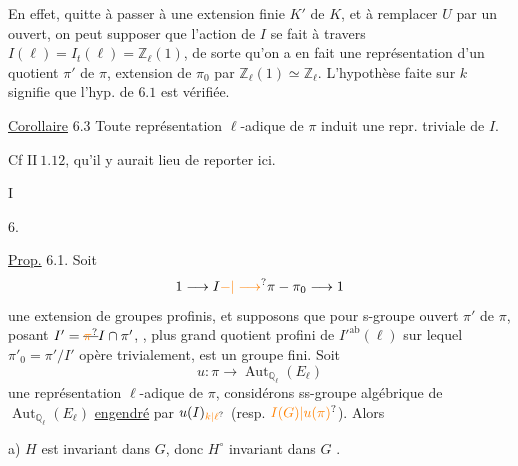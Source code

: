 En effet, quitte à passer à une extension finie $K'$ de $K$, et à remplacer $U$ par un ouvert, on peut supposer que l'action de $I$ se fait à travers $I(\ell)=I_t(\ell)=\mathbb Z_\ell(1)$,  de sorte qu'on a en fait une représentation d'un quotient $\pi'$ de $\pi$, extension de $\pi_0$ par $\mathbb Z_\ell(1)\simeq\mathbb Z_\ell$. L'hypothèse faite sur $k$ signifie que l'hyp. de $6.1$ est vérifiée.

\uline{Corollaire} 6.3 Toute représentation $\ell$-adique   de $\pi$ induit une repr.  triviale de $I$.

Cf $\mathrm{II}\ 1.12$, qu'il y aurait lieu de reporter ici.

I

6.

\uline{Prop.} 6.1. Soit
\[
1\longrightarrow I\unsure{-|\longrightarrow}\pi-\pi_0\longrightarrow1
\]
une extension de groupes profinis, et supposons que pour  s-groupe ouvert  $\pi'$ de $\pi$, posant $I'=\deleted{\unsure{\pi}}I\cap\pi'$,   , plus grand quotient profini  de $I'^{\mathrm{ab}}(\ell)$ sur lequel $\pi'_0=\pi'/I'$ opère trivialement, est un groupe fini. Soit
\[
u:\pi\longrightarrow\operatorname{Aut}_{\mathbb Q_\ell}(E_\ell)
\]
une représentation $\ell$-adique de $\pi$,  considérons  ss-groupe algébrique  de $\operatorname{Aut}_{\mathbb Q_\ell}(E_\ell)$ \uline{engendré} par $u(I)_{\unsure{k|\ell}}$ (resp. $\unsure{I(G)|u(\pi)}$). Alors

 a) $H$ est invariant dans $G$, donc $H^\circ$ invariant dans $G$ .


